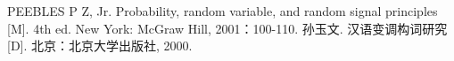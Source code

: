 \documentclass{book}
\begin{document}
\begin{thebibliography}{99}
 PEEBLES P Z, Jr. Probability, random variable, and random signal
principles [M]. 4th ed. New York: McGraw Hill, 2001：100-110.
 孙玉文. 汉语变调构词研究 [D]. 北京：北京大学出版社, 2000.
\end{thebibliography}
\end{document}
